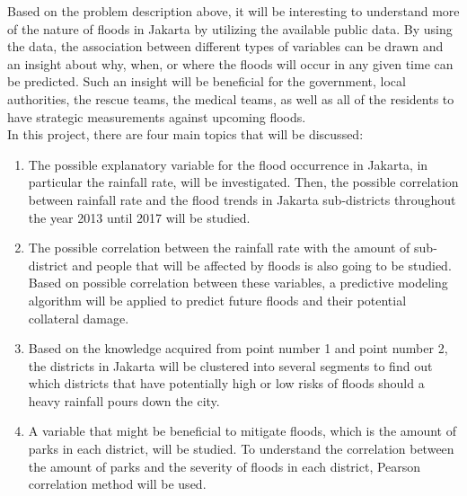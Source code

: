 Based on the problem description above, it will be interesting to understand more of the nature of floods in Jakarta by utilizing the available public data. By using the data, the association between different types of variables can be drawn and an insight about why, when, or where the floods will occur in any given time can be predicted. Such an insight will be beneficial for the government, local authorities, the rescue teams, the medical teams, as well as all of the residents to have strategic measurements against upcoming floods.\\

\noindent
In this project, there are four main topics that will be discussed:
\begin{enumerate}
  \item The possible explanatory variable for the flood occurrence in Jakarta, in particular the rainfall rate, will be investigated. Then, the possible correlation between rainfall rate and the flood trends in Jakarta sub-districts throughout the year 2013 until 2017 will be studied. 
   \item The possible correlation between the rainfall rate with the amount of sub-district and people that will be affected by floods is also going to be studied. Based on possible correlation between these variables, a predictive modeling algorithm will be applied to predict future floods and their potential collateral damage.
   \item Based on the knowledge acquired from point number 1 and point number 2, the districts in Jakarta will be clustered into several segments to find out which districts that have potentially high or low risks of floods should a heavy rainfall pours down the city. 
   \item A variable that might be beneficial to mitigate floods, which is the amount of parks in each district, will be studied. To understand the correlation between the amount of parks and the severity of floods in each district, Pearson correlation method will be used.
\end{enumerate}

